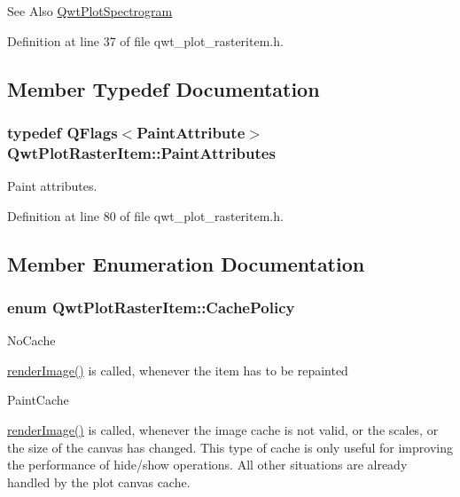 \begin{DoxySeeAlso}{See Also}
\hyperlink{class_qwt_plot_spectrogram}{Qwt\-Plot\-Spectrogram} 
\end{DoxySeeAlso}


Definition at line 37 of file qwt\-\_\-plot\-\_\-rasteritem.\-h.



\subsection{Member Typedef Documentation}
\hypertarget{class_qwt_plot_raster_item_a6bde441d571c4943da01765dec2d4b4a}{
\subsubsection[{Paint\-Attributes}]{\setlength{\rightskip}{0pt plus 5cm}typedef Q\-Flags$<${\bf Paint\-Attribute}$>$ {\bf Qwt\-Plot\-Raster\-Item\-::\-Paint\-Attributes}}}\label{class_qwt_plot_raster_item_a6bde441d571c4943da01765dec2d4b4a}


Paint attributes. 



Definition at line 80 of file qwt\-\_\-plot\-\_\-rasteritem.\-h.



\subsection{Member Enumeration Documentation}
\hypertarget{class_qwt_plot_raster_item_a94929fc4c31c3dab75ee5adcac2d57b0}{
\subsubsection[{Cache\-Policy}]{\setlength{\rightskip}{0pt plus 5cm}enum {\bf Qwt\-Plot\-Raster\-Item\-::\-Cache\-Policy}}}\label{class_qwt_plot_raster_item_a94929fc4c31c3dab75ee5adcac2d57b0}

\begin{DoxyItemize}
\item No\-Cache\par
 \hyperlink{class_qwt_plot_raster_item_a1738b36c0e6e4073f3ad6629e7923f74}{render\-Image()} is called, whenever the item has to be repainted
\item Paint\-Cache\par
 \hyperlink{class_qwt_plot_raster_item_a1738b36c0e6e4073f3ad6629e7923f74}{render\-Image()} is called, whenever the image cache is not valid, or the scales, or the size of the canvas has changed. This type of cache is only useful for improving the performance of hide/show operations. All other situations are already handled by the plot canvas cache.
\end{DoxyItemize}

